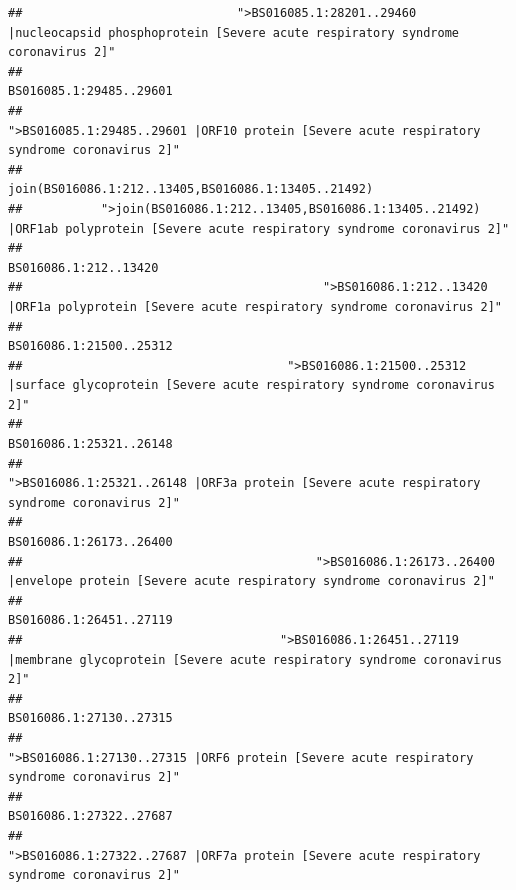 \documentclass[
]{article}
\begin{document}
\begin{verbatim}
##                              ">BS016085.1:28201..29460 |nucleocapsid phosphoprotein [Severe acute respiratory syndrome coronavirus 2]" 
##                                                                                                                BS016085.1:29485..29601 
##                                            ">BS016085.1:29485..29601 |ORF10 protein [Severe acute respiratory syndrome coronavirus 2]" 
##                                                                                    join(BS016086.1:212..13405,BS016086.1:13405..21492) 
##           ">join(BS016086.1:212..13405,BS016086.1:13405..21492) |ORF1ab polyprotein [Severe acute respiratory syndrome coronavirus 2]" 
##                                                                                                                  BS016086.1:212..13420 
##                                          ">BS016086.1:212..13420 |ORF1a polyprotein [Severe acute respiratory syndrome coronavirus 2]" 
##                                                                                                                BS016086.1:21500..25312 
##                                     ">BS016086.1:21500..25312 |surface glycoprotein [Severe acute respiratory syndrome coronavirus 2]" 
##                                                                                                                BS016086.1:25321..26148 
##                                            ">BS016086.1:25321..26148 |ORF3a protein [Severe acute respiratory syndrome coronavirus 2]" 
##                                                                                                                BS016086.1:26173..26400 
##                                         ">BS016086.1:26173..26400 |envelope protein [Severe acute respiratory syndrome coronavirus 2]" 
##                                                                                                                BS016086.1:26451..27119 
##                                    ">BS016086.1:26451..27119 |membrane glycoprotein [Severe acute respiratory syndrome coronavirus 2]" 
##                                                                                                                BS016086.1:27130..27315 
##                                             ">BS016086.1:27130..27315 |ORF6 protein [Severe acute respiratory syndrome coronavirus 2]" 
##                                                                                                                BS016086.1:27322..27687 
##                                            ">BS016086.1:27322..27687 |ORF7a protein [Severe acute respiratory syndrome coronavirus 2]" 

\end{verbatim}
\end{document}
